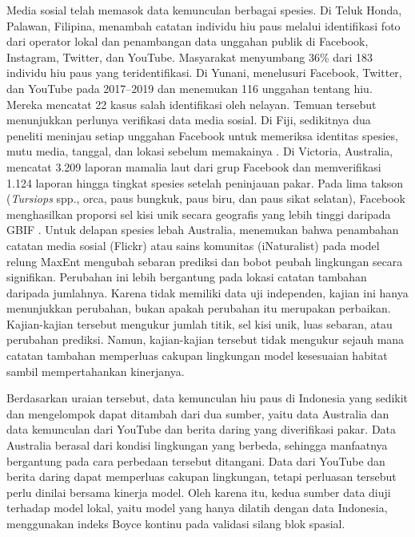 Media sosial telah memasok data kemunculan berbagai spesies. Di Teluk Honda,
Palawan, Filipina, \citet{Araujo2019} menambah catatan individu hiu paus
melalui identifikasi foto dari operator lokal dan penambangan data unggahan
publik di Facebook, Instagram, Twitter, dan YouTube. Masyarakat menyumbang 36\%
dari 183 individu hiu paus yang teridentifikasi. Di Yunani, \citet{Taklis2020}
menelusuri Facebook, Twitter, dan YouTube pada 2017--2019 dan menemukan 116
unggahan tentang hiu. Mereka mencatat 22 kasus salah identifikasi oleh nelayan.
Temuan tersebut menunjukkan perlunya verifikasi data media sosial. Di Fiji,
sedikitnya dua peneliti meninjau setiap unggahan Facebook untuk memeriksa
identitas spesies, mutu media, tanggal, dan lokasi sebelum memakainya
\citep{Dehm2025}. Di Victoria, Australia, \citet{Beddoe2026} mencatat 3.209
laporan mamalia laut dari grup Facebook dan memverifikasi 1.124 laporan hingga
tingkat spesies setelah peninjauan pakar. Pada lima takson
(\textit{Tursiops} spp., orca, paus bungkuk, paus biru, dan paus sikat
selatan), Facebook menghasilkan proporsi sel kisi unik secara geografis yang
lebih tinggi daripada GBIF \citep{Beddoe2026}. Untuk delapan spesies lebah
Australia, \citet{Moore2024} menemukan bahwa penambahan catatan media sosial
(Flickr) atau sains komunitas (iNaturalist) pada model relung MaxEnt mengubah
sebaran prediksi dan bobot peubah lingkungan secara signifikan. Perubahan ini
lebih bergantung pada lokasi catatan tambahan daripada jumlahnya. Karena tidak
memiliki data uji independen, kajian ini hanya menunjukkan perubahan, bukan
apakah perubahan itu merupakan perbaikan. Kajian-kajian tersebut mengukur
jumlah titik, sel kisi unik, luas sebaran, atau perubahan prediksi. Namun,
kajian-kajian tersebut tidak mengukur sejauh mana catatan tambahan memperluas
cakupan lingkungan model kesesuaian habitat sambil mempertahankan kinerjanya.

Berdasarkan uraian tersebut, data kemunculan hiu paus di Indonesia yang sedikit
dan mengelompok dapat ditambah dari dua sumber, yaitu data Australia dan data
kemunculan dari YouTube dan berita daring yang diverifikasi pakar. Data
Australia berasal dari kondisi lingkungan yang berbeda, sehingga manfaatnya
bergantung pada cara perbedaan tersebut ditangani. Data dari YouTube dan berita
daring dapat memperluas cakupan lingkungan, tetapi perluasan tersebut perlu
dinilai bersama kinerja model. Oleh karena itu, kedua sumber data diuji
terhadap model lokal, yaitu model yang hanya dilatih dengan data Indonesia,
menggunakan indeks Boyce kontinu pada validasi silang blok spasial.

